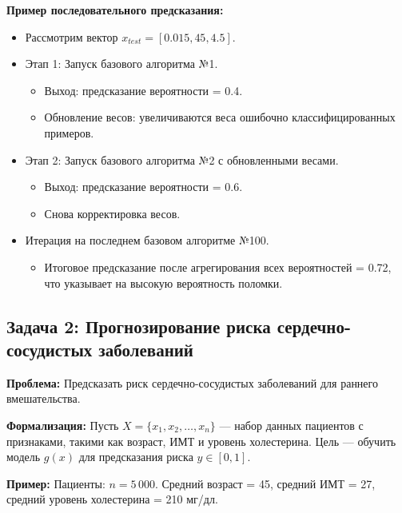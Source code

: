 \textbf{Пример последовательного предсказания:}
\begin{itemize}
    \item Рассмотрим вектор $x_{test} = [0.015, 45, 4.5]$.
    \item Этап 1: Запуск базового алгоритма №1.
        \begin{itemize}
            \item Выход: предсказание вероятности = 0.4.
            \item Обновление весов: увеличиваются веса ошибочно классифицированных примеров.
        \end{itemize}
    \item Этап 2: Запуск базового алгоритма №2 с обновленными весами.
        \begin{itemize}
            \item Выход: предсказание вероятности = 0.6.
            \item Снова корректировка весов.
        \end{itemize}
    \item Итерация на последнем базовом алгоритме №100.
        \begin{itemize}
            \item Итоговое предсказание после агрегирования всех вероятностей = 0.72, что указывает на высокую вероятность поломки.
        \end{itemize}
\end{itemize}


\subsection*{Задача 2: Прогнозирование риска сердечно-сосудистых заболеваний}

\textbf{Проблема:} Предсказать риск сердечно-сосудистых заболеваний для раннего вмешательства.

\textbf{Формализация:} 
Пусть $X = \{x_1, x_2, \ldots, x_n\}$ — набор данных пациентов с признаками, такими как возраст, ИМТ и уровень холестерина. Цель — обучить модель $g(x)$ для предсказания риска $y \in [0, 1]$.

\textbf{Пример:} 
Пациенты: $n = 5\,000$. Средний возраст = 45, средний ИМТ = 27, средний уровень холестерина = 210 мг/дл.

